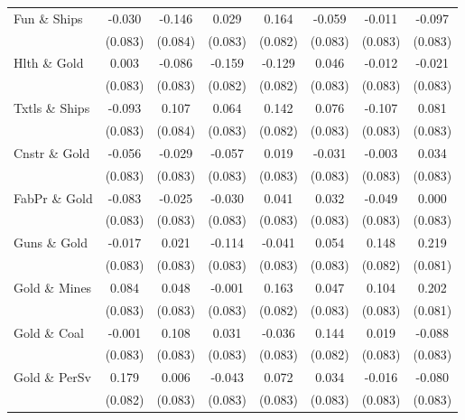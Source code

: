 \begin{table}
\begin{tabular}[t]{lccccccc}
Fun \& Ships & -0.030 & -0.146 & 0.029 & 0.164 & -0.059 & -0.011 & -0.097\\
 & (0.083) & (0.084) & (0.083) & (0.082) & (0.083) & (0.083) & (0.083)\\
\addlinespace
Hlth \& Gold & 0.003 & -0.086 & -0.159 & -0.129 & 0.046 & -0.012 & -0.021\\
 & (0.083) & (0.083) & (0.082) & (0.082) & (0.083) & (0.083) & (0.083)\\
Txtls \& Ships & -0.093 & 0.107 & 0.064 & 0.142 & 0.076 & -0.107 & 0.081\\
 & (0.083) & (0.084) & (0.083) & (0.082) & (0.083) & (0.083) & (0.083)\\
Cnstr \& Gold & -0.056 & -0.029 & -0.057 & 0.019 & -0.031 & -0.003 & 0.034\\
\addlinespace
 & (0.083) & (0.083) & (0.083) & (0.083) & (0.083) & (0.083) & (0.083)\\
FabPr \& Gold & -0.083 & -0.025 & -0.030 & 0.041 & 0.032 & -0.049 & 0.000\\
 & (0.083) & (0.083) & (0.083) & (0.083) & (0.083) & (0.083) & (0.083)\\
Guns \& Gold & -0.017 & 0.021 & -0.114 & -0.041 & 0.054 & 0.148 & 0.219\\
 & (0.083) & (0.083) & (0.083) & (0.083) & (0.083) & (0.082) & (0.081)\\
\addlinespace
Gold \& Mines & 0.084 & 0.048 & -0.001 & 0.163 & 0.047 & 0.104 & 0.202\\
 & (0.083) & (0.083) & (0.083) & (0.082) & (0.083) & (0.083) & (0.081)\\
Gold \& Coal & -0.001 & 0.108 & 0.031 & -0.036 & 0.144 & 0.019 & -0.088\\
 & (0.083) & (0.083) & (0.083) & (0.083) & (0.082) & (0.083) & (0.083)\\
Gold \& PerSv & 0.179 & 0.006 & -0.043 & 0.072 & 0.034 & -0.016 & -0.080\\
\addlinespace
 & (0.082) & (0.083) & (0.083) & (0.083) & (0.083) & (0.083) & (0.083)\\
\bottomrule
\end{tabular}
\end{table}

